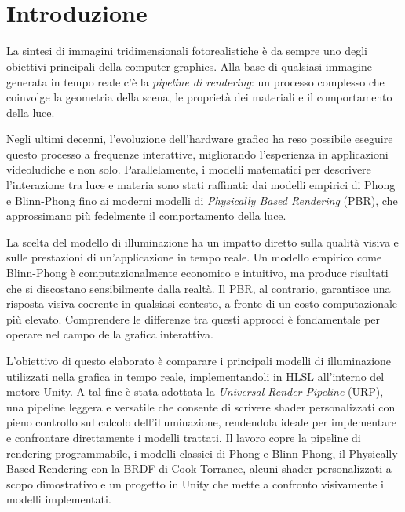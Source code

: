 \documentclass[12pt,a4paper,twoside]{book}
\begin{document}
\restoregeometry
\newpage

\newpage~\newpage


\topmargin=-1cm
\tableofcontents
\thispagestyle{empty}
\listoffigures
\thispagestyle{empty}

\listoftables
\thispagestyle{empty}

\lstlistoflistings
\thispagestyle{empty}

\newpage~\newpage

\raggedbottom

\chapter*{Introduzione} \label{chap:intro}
\pagestyle{plain}
\setcounter{page}{1}

La sintesi di immagini tridimensionali fotorealistiche è da sempre uno degli obiettivi principali della computer graphics. Alla base di qualsiasi immagine generata in tempo reale c'è la \textit{pipeline di rendering}: un processo complesso che coinvolge la geometria della scena, le proprietà dei materiali e il comportamento della luce.

Negli ultimi decenni, l'evoluzione dell'hardware grafico ha reso possibile eseguire questo processo a frequenze interattive, migliorando l'esperienza in applicazioni videoludiche e non solo. Parallelamente, i modelli matematici per descrivere l'interazione tra luce e materia sono stati raffinati: dai modelli empirici di Phong e Blinn-Phong fino ai moderni modelli di \textit{Physically Based Rendering} (PBR), che approssimano più fedelmente il comportamento della luce.

La scelta del modello di illuminazione ha un impatto diretto sulla qualità visiva e sulle prestazioni di un'applicazione in tempo reale. Un modello empirico come Blinn-Phong è computazionalmente economico e intuitivo, ma produce risultati che si discostano sensibilmente dalla realtà. Il PBR, al contrario, garantisce una risposta visiva coerente in qualsiasi contesto, a fronte di un costo computazionale più elevato. Comprendere le differenze tra questi approcci è fondamentale per operare nel campo della grafica interattiva.

L'obiettivo di questo elaborato è comparare i principali modelli di illuminazione utilizzati nella grafica in tempo reale, implementandoli in HLSL all'interno del motore Unity. A tal fine è stata adottata la \textit{Universal Render Pipeline} (URP), una pipeline leggera e versatile che consente di scrivere shader personalizzati con pieno controllo sul calcolo dell'illuminazione, rendendola ideale per implementare e confrontare direttamente i modelli trattati. Il lavoro copre la pipeline di rendering programmabile, i modelli classici di Phong e Blinn-Phong, il Physically Based Rendering con la BRDF di Cook-Torrance, alcuni shader personalizzati a scopo dimostrativo e un progetto in Unity che mette a confronto visivamente i modelli implementati.
\end{document}
